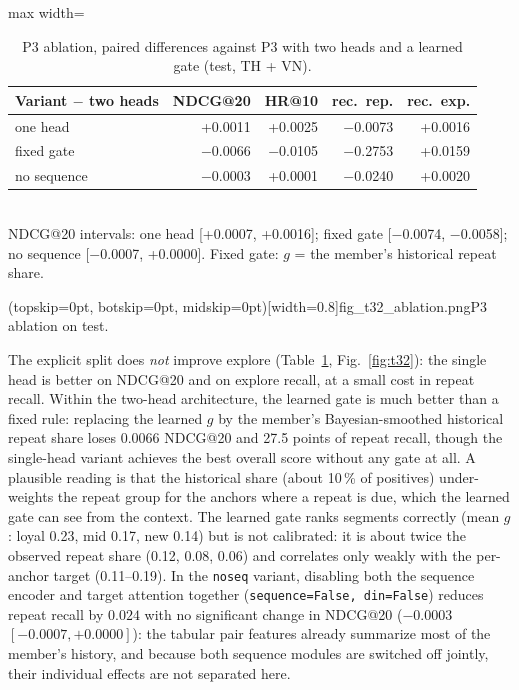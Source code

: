 \documentclass{ieeeaccess}
\begin{document}
\begin{table}[t]
\caption{P3 ablation, paired differences against P3 with two heads and a learned gate (test, TH + VN).}
\label{tab:t32}
\setlength{\tabcolsep}{2.5pt}
\centering
\begin{adjustbox}{max width=\columnwidth}
\begin{tabular}{lrrrr}
\toprule
Variant $-$ two heads & NDCG@20 & HR@10 & rec.\ rep. & rec.\ exp. \\
\midrule
one head              & +0.0011 & +0.0025 & $-$0.0073 & +0.0016 \\
fixed gate            & $-$0.0066 & $-$0.0105 & $-$0.2753 & +0.0159 \\
no sequence           & $-$0.0003 & +0.0001 & $-$0.0240 & +0.0020 \\
\bottomrule
\end{tabular}
\end{adjustbox}
\\[1ex]
{\footnotesize NDCG@20 intervals: one head [+0.0007, +0.0016]; fixed gate [$-$0.0074, $-$0.0058]; no sequence [$-$0.0007, +0.0000].
Fixed gate: $g$ = the member's historical repeat share.}
\end{table}

\Figure[t!](topskip=0pt, botskip=0pt, midskip=0pt)[width=0.8\textwidth]{fig_t32_ablation.png}{P3 ablation on test.\label{fig:t32}}

The explicit split does \emph{not} improve explore (Table~\ref{tab:t32}, Fig.~\ref{fig:t32}): the single head is better on NDCG@20
and on explore recall, at a small cost in repeat recall. Within the two-head architecture, the learned gate is much better than a fixed rule: replacing the learned $g$ by the member's
Bayesian-smoothed historical repeat share loses 0.0066 NDCG@20 and 27.5 points of repeat recall, though the single-head variant achieves the best overall score without any gate at all. A plausible reading is that the historical share
(about 10\,\% of positives) under-weights the repeat group for the anchors where a repeat is due, which the learned gate can see from
the context. The learned gate ranks segments correctly (mean $g$: loyal 0.23, mid 0.17, new 0.14) but is not calibrated: it is about
twice the observed repeat share (0.12, 0.08, 0.06) and correlates only weakly with the per-anchor target (0.11--0.19). In the \texttt{noseq} variant, disabling both the sequence encoder and target attention together (\texttt{sequence=False, din=False}) reduces repeat recall by $0.024$ with no significant change in NDCG@20 ($-0.0003$ $[-0.0007, +0.0000]$): the tabular pair features already summarize most of the member's history, and because both sequence modules are switched off jointly, their individual effects are not separated here.
\end{document}
